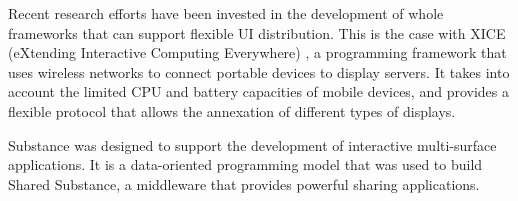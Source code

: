 Recent research efforts have been invested in the development of whole frameworks that can support flexible UI distribution.
This is the case with XICE (eXtending Interactive Computing Everywhere) \citep{Arthur:2011:xice}, a programming framework that uses wireless networks to connect portable devices to display servers.
It takes into account the limited CPU and battery capacities of mobile devices, and provides a flexible protocol that allows the annexation of different types of displays.

Substance \citep{Gjerlufsen:2011:substance} was designed to support the development of interactive multi-surface applications.
It is a data-oriented programming model that was used to build Shared Substance, a middleware that provides powerful sharing applications.





